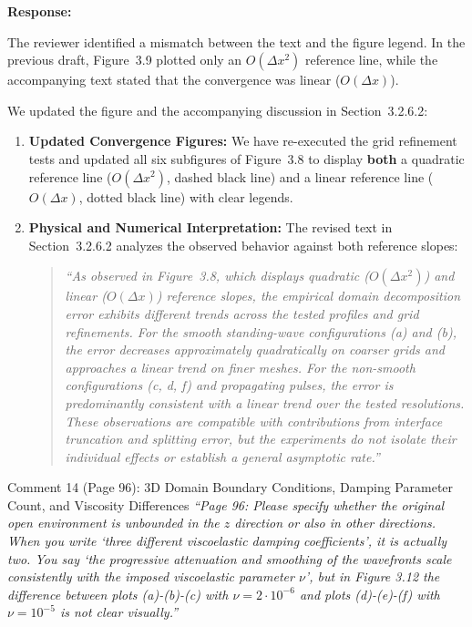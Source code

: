 \documentclass[11pt,a4paper]{article}
\newenvironment{response}{
    \par\vspace{1mm}\noindent\textbf{\textcolor{responseframe}{Response:}}\par\vspace{1mm}
}{
    \par\vspace{3mm}
}
\begin{document}
\begin{response}
The reviewer identified a mismatch between the text and the figure legend. In the previous draft, Figure~3.9 plotted only an $O(\Delta x^2)$ reference line, while the accompanying text stated that the convergence was linear ($O(\Delta x)$).

We updated the figure and the accompanying discussion in Section~3.2.6.2:
\begin{enumerate}[leftmargin=*]
    \item \textbf{Updated Convergence Figures:} We have re-executed the grid refinement tests and updated all six subfigures of Figure~3.8 to display \textbf{both} a quadratic reference line ($O(\Delta x^2)$, dashed black line) and a linear reference line ($O(\Delta x)$, dotted black line) with clear legends.
    \item \textbf{Physical and Numerical Interpretation:} The revised text in Section~3.2.6.2 analyzes the observed behavior against both reference slopes:
    \begin{quote}
    \emph{``As observed in Figure~3.8, which displays quadratic ($O(\Delta x^2)$) and linear ($O(\Delta x)$) reference slopes, the empirical domain decomposition error exhibits different trends across the tested profiles and grid refinements. For the smooth standing-wave configurations (a) and (b), the error decreases approximately quadratically on coarser grids and approaches a linear trend on finer meshes. For the non-smooth configurations (c, d, f) and propagating pulses, the error is predominantly consistent with a linear trend over the tested resolutions. These observations are compatible with contributions from interface truncation and splitting error, but the experiments do not isolate their individual effects or establish a general asymptotic rate.''}
    \end{quote}
\end{enumerate}
\end{response}

\vspace{2mm}
\begin{revcomment}{Comment 14 (Page 96): 3D Domain Boundary Conditions, Damping Parameter Count, and Viscosity Differences}
\emph{``Page 96: Please specify whether the original open environment is unbounded in the $z$ direction or also in other directions. When you write `three different viscoelastic damping coefficients', it is actually two. You say `the progressive attenuation and smoothing of the wavefronts scale consistently with the imposed viscoelastic parameter $\nu$', but in Figure 3.12 the difference between plots (a)-(b)-(c) with $\nu = 2 \cdot 10^{-6}$ and plots (d)-(e)-(f) with $\nu = 10^{-5}$ is not clear visually.''}
\end{revcomment}
\end{document}
